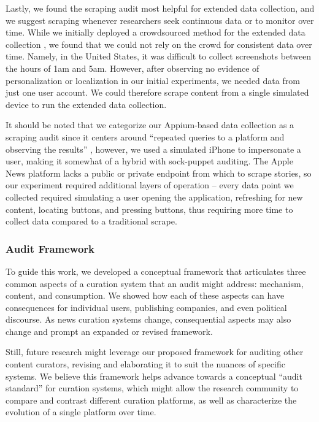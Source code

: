 Lastly, we found the scraping audit most helpful for extended data collection, and we suggest scraping whenever researchers seek continuous data or to monitor over time. While we initially deployed a crowdsourced method for the extended data collection \citep{Bandy}, we found that we could not rely on the crowd for consistent data over time. Namely, in the United States, it was difficult to collect screenshots between the hours of 1am and 5am. However, after observing no evidence of personalization or localization in our initial experiments, we needed data from just one user account. We could therefore scrape content from a single simulated device to run the extended data collection.

It should be noted that we categorize our Appium-based data collection as a scraping audit since it centers around ``repeated queries to a platform and observing the results'' \citep{Sandvig2014}, however, we used a simulated iPhone to impersonate a user, making it somewhat of a hybrid with sock-puppet auditing. The Apple News platform lacks a public or private endpoint from which to scrape stories, so our experiment required additional layers of operation -- every data point we collected required simulating a user opening the application, refreshing for new content, locating buttons, and pressing buttons, thus requiring more time to collect data compared to a traditional scrape.

\subsubsection{Audit Framework}
To guide this work, we developed a conceptual framework that articulates three common aspects of a curation system that an audit might address: mechanism, content, and consumption. We showed how each of these aspects can have consequences for individual users, publishing companies, and even political discourse. As news curation systems change, consequential aspects may also change and prompt an expanded or revised framework.

Still, future research might leverage our proposed framework for auditing other content curators, revising and elaborating it to suit the nuances of specific systems. We believe this framework helps advance towards a conceptual ``audit standard'' for curation systems, which might allow the research community to compare and contrast different curation platforms, as well as characterize the evolution of a single platform over time.


